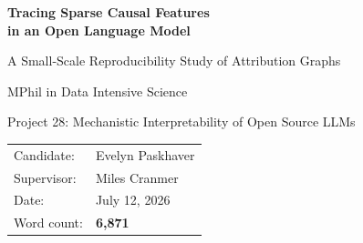 \documentclass[11pt,a4paper]{article}
\newcommand{\reportwordcount}{6,871}
\begin{document}
\onehalfspacing
{}

\begin{titlepage}
    \centering
    \vspace*{2.0cm}
    {\LARGE\bfseries Tracing Sparse Causal Features\\in an Open Language Model\par}
    \vspace{0.5cm}
    {\Large A Small-Scale Reproducibility Study of Attribution Graphs\par}
    \vspace{2.0cm}
    {\large MPhil in Data Intensive Science\par}
    \vspace{0.5cm}
    {\large Project 28: Mechanistic Interpretability of Open Source LLMs\par}
    \vfill
    \begin{tabular}{ll}         Candidate: & Evelyn Paskhaver \\
        Supervisor: & Miles Cranmer \\
        Date: & July 12, 2026 \\
        Word count: & \textbf{\reportwordcount} \\
    \end{tabular}
    \vfill
\end{titlepage}
\clearpage
{}
\end{document}
